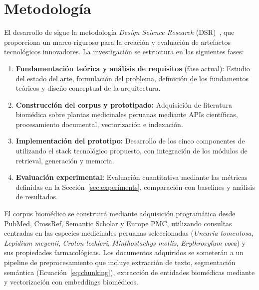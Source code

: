 
\section{Metodología}
\label{sec:methodology}

El desarrollo de \sirca{} sigue la metodología \textit{Design Science Research} (DSR)~\cite{hevner2004design}, que proporciona un marco riguroso para la creación y evaluación de artefactos tecnológicos innovadores. La investigación se estructura en las siguientes fases:

\begin{enumerate}[label=\textbf{Fase \arabic*:}]
  \item \textbf{Fundamentación teórica y análisis de requisitos} (fase actual): Estudio del estado del arte, formulación del problema, definición de los fundamentos teóricos y diseño conceptual de la arquitectura.

  \item \textbf{Construcción del corpus y prototipado:} Adquisición de literatura biomédica sobre plantas medicinales peruanas mediante APIs científicas, procesamiento documental, vectorización e indexación.

  \item \textbf{Implementación del prototipo:} Desarrollo de los cinco componentes de \sirca{} utilizando el stack tecnológico propuesto, con integración de los módulos de retrieval, generación y memoria.

  \item \textbf{Evaluación experimental:} Evaluación cuantitativa mediante las métricas definidas en la Sección~\ref{sec:experiments}, comparación con baselines y análisis de resultados.
\end{enumerate}

El corpus biomédico se construirá mediante adquisición programática desde PubMed, CrossRef, Semantic Scholar y Europe PMC, utilizando consultas centradas en las especies medicinales peruanas seleccionadas (\textit{Uncaria tomentosa}, \textit{Lepidium meyenii}, \textit{Croton lechleri}, \textit{Minthostachys mollis}, \textit{Erythroxylum coca}) y sus propiedades farmacológicas. Los documentos adquiridos se someterán a un pipeline de preprocesamiento que incluye extracción de texto, segmentación semántica (Ecuación~\ref{eq:chunking}), extracción de entidades biomédicas mediante \scispacy{} y vectorización con embeddings biomédicos.
